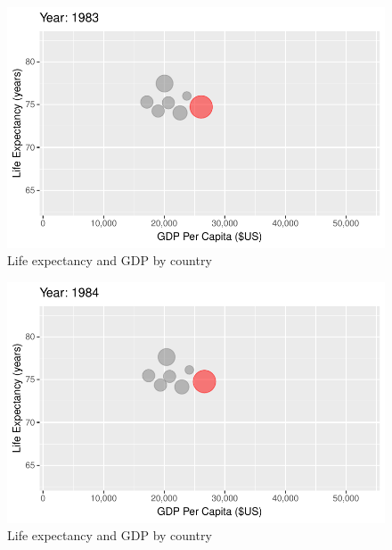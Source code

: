 \documentclass[
  letterpaper,
  DIV=11,
  numbers=noendperiod]{scrreport}
\theoremstyle{definition}
\theoremstyle{remark}
\begin{document}
\begin{figure}

{\centering \includegraphics{index_files/figure-pdf/fig-anim-country-57.pdf}

}

\caption{\label{fig-anim-country-57}Life expectancy and GDP by country}

\end{figure}

\begin{figure}

{\centering \includegraphics{index_files/figure-pdf/fig-anim-country-58.pdf}

}

\caption{\label{fig-anim-country-58}Life expectancy and GDP by country}

\end{figure}
\end{document}
